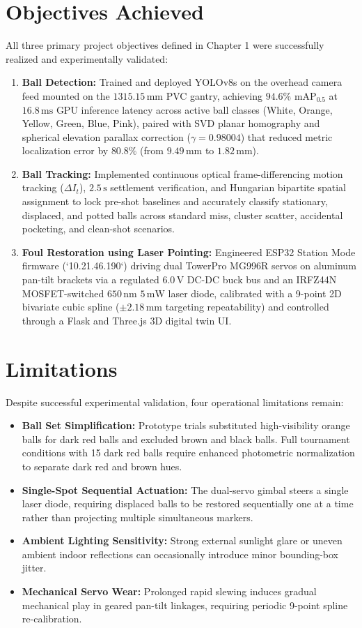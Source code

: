 \section{Objectives Achieved}
All three primary project objectives defined in Chapter 1 were successfully realized and experimentally validated:
\begin{enumerate}
    \item[\textbf{O1.}] \textbf{Ball Detection:} Trained and deployed YOLOv8s on the overhead camera feed mounted on the $1315.15\,\text{mm}$ PVC gantry, achieving $94.6\%$ $\text{mAP}_{0.5}$ at $16.8\,\text{ms}$ GPU inference latency across active ball classes (White, Orange, Yellow, Green, Blue, Pink), paired with SVD planar homography and spherical elevation parallax correction ($\gamma = 0.98004$) that reduced metric localization error by $80.8\%$ (from $9.49\,\text{mm}$ to $1.82\,\text{mm}$).
    \item[\textbf{O2.}] \textbf{Ball Tracking:} Implemented continuous optical frame-differencing motion tracking ($\Delta I_t$), $2.5\,\text{s}$ settlement verification, and Hungarian bipartite spatial assignment to lock pre-shot baselines and accurately classify stationary, displaced, and potted balls across standard miss, cluster scatter, accidental pocketing, and clean-shot scenarios.
    \item[\textbf{O3.}] \textbf{Foul Restoration using Laser Pointing:} Engineered ESP32 Station Mode firmware (`10.21.46.190`) driving dual TowerPro MG996R servos on aluminum pan-tilt brackets via a regulated $6.0\,\text{V}$ DC-DC buck bus and an IRFZ44N MOSFET-switched $650\,\text{nm}$ $5\,\text{mW}$ laser diode, calibrated with a 9-point 2D bivariate cubic spline ($\pm 2.18\,\text{mm}$ targeting repeatability) and controlled through a Flask and Three.js 3D digital twin UI.
\end{enumerate}

\section{Limitations}
Despite successful experimental validation, four operational limitations remain:
\begin{itemize}
    \item \textbf{Ball Set Simplification:} Prototype trials substituted high-visibility orange balls for dark red balls and excluded brown and black balls. Full tournament conditions with 15 dark red balls require enhanced photometric normalization to separate dark red and brown hues.
    \item \textbf{Single-Spot Sequential Actuation:} The dual-servo gimbal steers a single laser diode, requiring displaced balls to be restored sequentially one at a time rather than projecting multiple simultaneous markers.
    \item \textbf{Ambient Lighting Sensitivity:} Strong external sunlight glare or uneven ambient indoor reflections can occasionally introduce minor bounding-box jitter.
    \item \textbf{Mechanical Servo Wear:} Prolonged rapid slewing induces gradual mechanical play in geared pan-tilt linkages, requiring periodic 9-point spline re-calibration.
\end{itemize}

